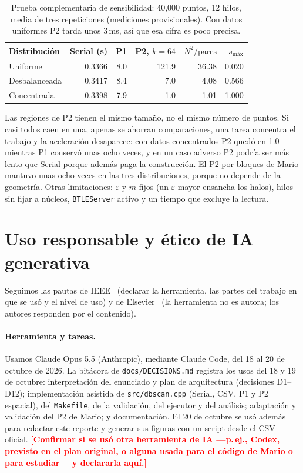 \documentclass[11pt,letterpaper]{article}
\newcommand{\code}[1]{\texttt{#1}}
\newcommand{\pendiente}[1]{\textcolor{red}{\textbf{[#1]}}}
\newcommand{\smax}{s_{\text{máx}}}
\begin{document}
\begin{table}[t]
\centering\small
\caption{Prueba complementaria de sensibilidad: 40,000 puntos, 12 hilos, media de tres repeticiones (mediciones
provisionales). Con datos uniformes P2 tarda unos 3\,ms, así que esa cifra es poco precisa.}
\label{tab:sens}
\begin{tabular}{@{}lrrrrr@{}}
\toprule
Distribución & Serial (s) & P1 & P2, $k=64$ & $N^2/\text{pares}$ & $\smax$\\
\midrule
Uniforme       & 0.3366 & 8.0 & 121.9 & 36.38 & 0.020\\
Desbalanceada  & 0.3417 & 8.4 &   7.0 &  4.08 & 0.566\\
Concentrada    & 0.3398 & 7.9 &   1.0 &  1.01 & 1.000\\
\bottomrule
\end{tabular}
\end{table}

Las regiones de P2 tienen el mismo tamaño, no el mismo número de puntos. Si casi todos caen en una, apenas se ahorran
comparaciones, una tarea concentra el trabajo y la aceleración desaparece: con datos concentrados P2 quedó en 1.0
mientras P1 conservó unas ocho veces, y en un caso adverso P2 podría ser más lento que Serial porque además paga la
construcción. El P2 por bloques de Mario mantuvo unas ocho veces en las tres
distribuciones, porque no depende de la geometría. Otras limitaciones: $\varepsilon$ y $m$ fijos (un $\varepsilon$
mayor ensancha los halos), hilos sin fijar a núcleos, \code{BTLEServer} activo y un tiempo que excluye la lectura.

\section{Uso responsable y ético de IA generativa}\label{sec:ia}

Seguimos las pautas de IEEE~\cite{ieee-ai} (declarar la herramienta, las partes del trabajo en que se usó y el nivel
de uso) y de Elsevier~\cite{elsevier-ai} (la herramienta no es autora; los autores responden por el contenido).

\paragraph{Herramienta y tareas.} Usamos Claude Opus 5.5 (Anthropic), mediante Claude Code, del 18 al 20 de octubre
de 2026. La bitácora de \code{docs/DECISIONS.md} registra los usos del 18 y 19 de octubre: interpretación del enunciado y plan de
arquitectura (decisiones D1--D12); implementación asistida de \code{src/dbscan.cpp} (Serial, CSV, P1 y P2 espacial),
del \code{Makefile}, de la validación, del ejecutor y del análisis; adaptación y validación del P2 de Mario; y documentación. El 20 de octubre se usó además para redactar este reporte y generar sus figuras con un script desde el CSV oficial.
\pendiente{Confirmar si se usó otra herramienta de IA ---p.\,ej., Codex, previsto en el plan original, o
alguna usada para el código de Mario o para estudiar--- y declararla aquí.}
\end{document}
